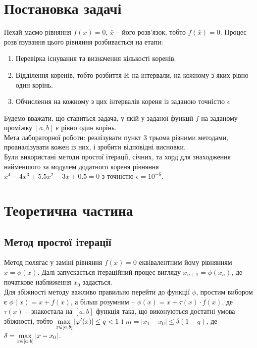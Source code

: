 




\section{Постановка задачі} 

Нехай маємо рівняння $f(x) = 0$, $\bar x$ -- його розв'язок, тобто $f(\bar x)=0$. Процес розв'язування цього рівняння розбивається на етапи: 
\begin{enumerate}
\item Перевірка існування та визначення кількості коренів.
\item Відділення коренів, тобто розбиття $\mathbb{R}$ на інтервали, на кожному з яких рівно один корінь.
\item Обчислення на кожному з цих інтервалів кореня із заданою точністю  $\epsilon$
\end{enumerate}

Будемо вважати, що ставиться задача, у якій у заданої функції $f$ на заданому проміжку $[a, b]$ є рівно один корінь.\\

Мета лабораторної роботи: реалізувати пункт 3 трьома різними методами, проаналізувати кожен із них, і зробити відповідні висновки.\\

Були використані методи простої ітерації, січних, та хорд для знаходження найменшого за модулем додатного кореня рівняння $x^4 - 4 x^3 + 5.5 x^2 - 3x + 0.5 = 0$ з точністю $\epsilon = 10^{-6}$.

\section{Теоретична частина} 

\subsection{Метод простої ітерації}

Метод полягає у заміні рівняння $f(x) = 0$ еквівалентним йому рівнянням $x = \phi(x)$. Далі запускається ітераційний процес вигляду $x_{n + 1} = \phi(x_n)$, де початкове наближення $x_0$ задається. \\

Для збіжності методу важливо правильно перейти до функції $\phi$, простим вибором є $\phi(x) = x + f(x)$, а більш розумним -- $\phi(x) = x + \tau(x) \cdot f(x)$, де $\tau(x)$ -- знакостала на $[a, b]$ функція така, що виконуються достатні умова збіжності, тобто $\displaystyle\max\limits_{x\in[a,b]} |\varphi^\prime(x)| \le q < 1$ і $m = |x_1 - x_0| \le \delta (1 - q)$, де $\delta = \displaystyle\max\limits_{x\in[a,b]}|x - x_0|$. \\

